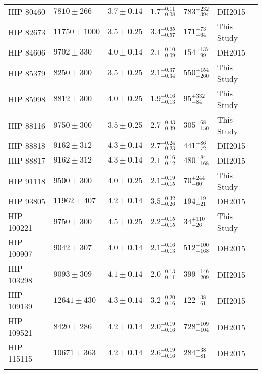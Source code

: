 \documentclass{emulateapj}
\begin{document}
\begin{longtable*}{|l|lllll|}
  HIP 80460 &    $7810 \pm 266$ &  $3.7 \pm 0.14$ &  $1.7^{+0.11}_{-0.08}$ &  $783^{+232}_{-394}$ &      DH2015 \\
  HIP 82673 &  $11750 \pm 1000$ &  $3.5 \pm 0.25$ &  $3.4^{+0.65}_{-0.57}$ &    $171^{+73}_{-64}$ &  This Study \\
  HIP 84606 &    $9702 \pm 330$ &  $4.0 \pm 0.14$ &  $2.1^{+0.10}_{-0.09}$ &   $154^{+137}_{-99}$ &      DH2015 \\
  HIP 85379 &    $8250 \pm 300$ &  $3.5 \pm 0.25$ &  $2.1^{+0.37}_{-0.34}$ &  $550^{+154}_{-260}$ &  This Study \\
  HIP 85998 &    $8812 \pm 300$ &  $4.0 \pm 0.25$ &  $1.9^{+0.16}_{-0.13}$ &    $95^{+332}_{-84}$ &  This Study \\
  HIP 88116 &    $9750 \pm 300$ &  $3.5 \pm 0.25$ &  $2.7^{+0.43}_{-0.39}$ &   $305^{+68}_{-150}$ &  This Study \\
  HIP 88818 &    $9162 \pm 312$ &  $4.3 \pm 0.14$ &  $2.7^{+0.24}_{-0.23}$ &    $441^{+86}_{-72}$ &      DH2015 \\
  HIP 88817 &    $9162 \pm 312$ &  $4.3 \pm 0.14$ &  $2.1^{+0.16}_{-0.12}$ &   $480^{+84}_{-168}$ &      DH2015 \\
  HIP 91118 &    $9500 \pm 300$ &  $4.0 \pm 0.25$ &  $2.1^{+0.19}_{-0.15}$ &    $70^{+244}_{-60}$ &  This Study \\
  HIP 93805 &   $11962 \pm 407$ &  $4.2 \pm 0.14$ &  $3.5^{+0.32}_{-0.26}$ &    $194^{+19}_{-21}$ &      DH2015 \\
 HIP 100221 &    $9750 \pm 300$ &  $4.5 \pm 0.25$ &  $2.2^{+0.15}_{-0.15}$ &    $34^{+110}_{-26}$ &  This Study \\
 HIP 100907 &    $9042 \pm 307$ &  $4.0 \pm 0.14$ &  $2.1^{+0.16}_{-0.13}$ &  $512^{+100}_{-168}$ &      DH2015 \\
 HIP 103298 &    $9093 \pm 309$ &  $4.1 \pm 0.14$ &  $2.0^{+0.13}_{-0.11}$ &  $399^{+146}_{-209}$ &      DH2015 \\
 HIP 109139 &   $12641 \pm 430$ &  $4.3 \pm 0.14$ &  $3.2^{+0.20}_{-0.16}$ &    $122^{+38}_{-61}$ &      DH2015 \\
 HIP 109521 &    $8420 \pm 286$ &  $4.2 \pm 0.14$ &  $2.0^{+0.19}_{-0.16}$ &  $728^{+109}_{-104}$ &      DH2015 \\
 HIP 115115 &   $10671 \pm 363$ &  $4.2 \pm 0.14$ &  $2.6^{+0.19}_{-0.16}$ &    $284^{+38}_{-81}$ &      DH2015 \\
\label{tab:primary}
\end{longtable*}
\end{document}

